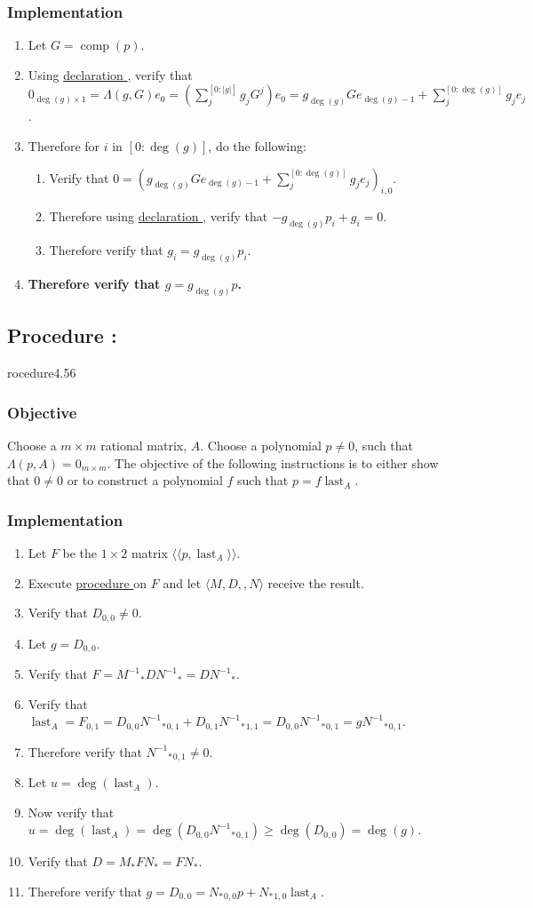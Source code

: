 \documentclass{article}
\DeclareMathOperator{\comp}{comp}
\DeclareMathOperator{\last}{last}
\newcounter{declaration}[part]
\newcommand{\declarationhr}[1]{\hyperref[sec:declaration #1]{declaration \expandafter\csname declaration#1\endcsname}}
\newcounter{procedure}[part]
\newcommand{\procedure}[1]{\subsection*{Procedure \thepart:\theprocedure}\label{sec:procedure #1}\global\expandafter\edef\csname procedure#1\endcsname{\thepart:\theprocedure}\addtocounter{procedure}{1}}
\newcommand{\objective}{\subsubsection*{Objective}}
\newcommand{\implementation}{\subsubsection*{Implementation}}
\newcommand{\procedurehr}[1]{\hyperref[sec:procedure #1]{procedure \expandafter\csname procedure#1\endcsname}}
\begin{document}
\begin{multicols}{2}
			\implementation
				\begin{enumerate}
					\item Let $G=\comp(p)$.
					\item Using \declarationhr{4.16}, verify that $0_{\deg(g)\times 1}=\Lambda(g,G)e_0=(\sum_j^{[0:\lvert g\rvert]}g_jG^j)e_0=g_{\deg(g)}Ge_{\deg(g)-1}+\sum_j^{[0:\deg(g)]}g_je_j$.
					\item Therefore for $i$ in $[0:\deg(g)]$, do the following:
					\begin{enumerate}
						\item Verify that $0=(g_{\deg(g)}Ge_{\deg(g)-1}+\sum_j^{[0:\deg(g)]}g_je_j)_{i,0}$.
						\item Therefore using \declarationhr{4.16}, verify that $-g_{\deg(g)}p_{i}+g_{i}=0$.
						\item Therefore verify that $g_{i}=g_{\deg(g)}p_{i}$.
					\end{enumerate}
					\item \textbf{Therefore verify that $g=g_{\deg(g)}p$.}
				\end{enumerate}
		\procedure{4.56}
			\objective
				Choose a $m\times m$ rational matrix, $A$. Choose a polynomial $p\ne 0$, such that $\Lambda(p,A)=0_{m\times m}$. The objective of the following instructions is to either show that $0\ne 0$ or to construct a polynomial $f$ such that $p=f\last_A$.
			\implementation
				\begin{enumerate}
					\item Let $F$ be the $1\times 2$ matrix $\langle\langle p,\last_A\rangle\rangle$.
					\item Execute \procedurehr{4.25} on $F$ and let $\langle M,D,,N\rangle$ receive the result.
					\item Verify that $D_{0,0}\ne 0$.
					\item Let $g=D_{0,0}$.
					\item Verify that $F={M^{-1}}_*D{N^{-1}}_*=D{N^{-1}}_*$.
					\item Verify that $\last_A=F_{0,1}=D_{0,0}{{N^{-1}}_*}_{0,1}+D_{0,1}{{N^{-1}}_*}_{1,1}=D_{0,0}{{N^{-1}}_*}_{0,1}=g{{N^{-1}}_*}_{0,1}$.
					\item Therefore verify that ${{N^{-1}}_*}_{0,1}\ne 0$.
					\item Let $u=\deg(\last_A)$.
					\item Now verify that $u=\deg(\last_A)=\deg(D_{0,0}{{N^{-1}}_*}_{0,1})\ge\deg(D_{0,0})=\deg(g)$.
					\item Verify that $D=M_*FN_*=FN_*$.
					\item Therefore verify that $g=D_{0,0}={N_*}_{0,0}p+{N_*}_{1,0}\last_A$.

\end{enumerate}
\end{multicols}
\end{document}
